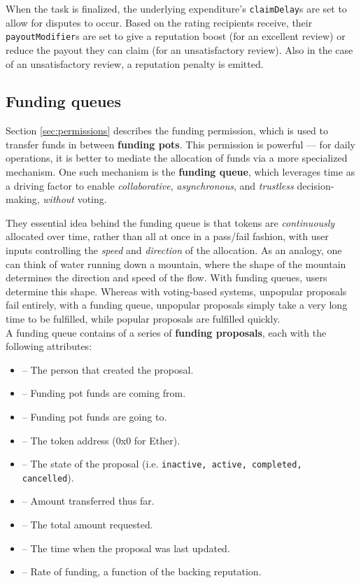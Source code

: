 When the task is finalized, the underlying expenditure's \texttt{claimDelay}s are set to allow for disputes to occur. Based on the rating recipients receive, their \texttt{payoutModifier}s are set to give a reputation boost (for an excellent review) or reduce the payout they can claim (for an unsatisfactory review). Also in the case of an unsatisfactory review, a reputation penalty is emitted.

\subsection{Funding queues}\label{sec:funding-queues}

Section \ref{sec:permissions} describes the funding permission, which is used to transfer funds in between \textbf{funding pots}. This permission is powerful --- for daily operations, it is better to mediate the allocation of funds via a more specialized mechanism. One such mechanism is the \textbf{funding queue}, which leverages time as a driving factor to enable \textit{collaborative}, \textit{asynchronous}, and \textit{trustless} decision-making, \textit{without} voting.

They essential idea behind the funding queue is that tokens are \textit{continuously} allocated over time, rather than all at once in a pass/fail fashion, with user inputs controlling the \textit{speed} and \textit{direction} of the allocation. As an analogy, one can think of water running down a mountain, where the shape of the mountain determines the direction and speed of the flow. With funding queues, users determine this shape. Whereas with voting-based systems, unpopular proposals fail entirely, with a funding queue, unpopular proposals simply take a very long time to be fulfilled, while popular proposals are fulfilled quickly. \\

A funding queue contains of a series of \textbf{funding proposals}, each with the following attributes:

 \begin{itemize}
  \item {} -- The person that created the proposal.
  \item {} -- Funding pot funds are coming from.
  \item {} -- Funding pot funds are going to.
  \item {} -- The token address (0x0 for Ether).
  \item {} -- The state of the proposal (i.e. \texttt{inactive, active, completed, cancelled}).
  \item {} -- Amount transferred thus far.
  \item {} -- The total amount requested.
  \item {} -- The time when the proposal was last updated.
  \item {} -- Rate of funding, a function of the backing reputation.
 \end{itemize}

